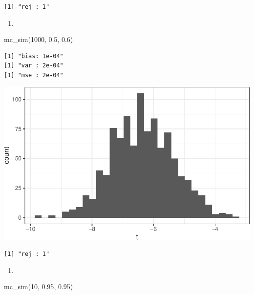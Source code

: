 \documentclass[
  letterpaper,
  DIV=11,
  numbers=noendperiod]{scrreprt}
\newenvironment{Shaded}{\begin{snugshade}}{\end{snugshade}}
\newcommand{\DecValTok}[1]{\textcolor[rgb]{0.68,0.00,0.00}{#1}}
\newcommand{\FloatTok}[1]{\textcolor[rgb]{0.68,0.00,0.00}{#1}}
\newcommand{\FunctionTok}[1]{\textcolor[rgb]{0.28,0.35,0.67}{#1}}
\newcommand{\NormalTok}[1]{\textcolor[rgb]{0.00,0.23,0.31}{#1}}
\providecommand{\tightlist}{%
  \setlength{\itemsep}{0pt}\setlength{\parskip}{0pt}}\usepackage{longtable,booktabs,array}
\begin{document}
\begin{verbatim}
[1] "rej : 1"
\end{verbatim}

\begin{enumerate}
\def\labelenumi{\arabic{enumi}.}
\setcounter{enumi}{6}
\tightlist
\item
\end{enumerate}

\begin{Shaded}
\begin{Highlighting}[]
\FunctionTok{mc\_sim}\NormalTok{(}\DecValTok{1000}\NormalTok{, }\FloatTok{0.5}\NormalTok{, }\FloatTok{0.6}\NormalTok{)}
\end{Highlighting}
\end{Shaded}

\begin{verbatim}
[1] "bias: 1e-04"
[1] "var : 2e-04"
[1] "mse : 2e-04"
\end{verbatim}

\includegraphics{07-inference_files/figure-pdf/unnamed-chunk-14-1.pdf}

\begin{verbatim}
[1] "rej : 1"
\end{verbatim}

\begin{enumerate}
\def\labelenumi{\arabic{enumi}.}
\setcounter{enumi}{7}
\tightlist
\item
\end{enumerate}

\begin{Shaded}
\begin{Highlighting}[]
\FunctionTok{mc\_sim}\NormalTok{(}\DecValTok{10}\NormalTok{, }\FloatTok{0.95}\NormalTok{, }\FloatTok{0.95}\NormalTok{)}
\end{Highlighting}
\end{Shaded}
\end{document}

